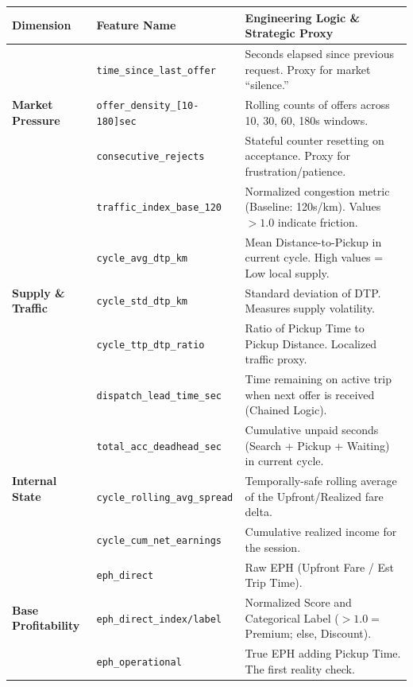 \begin{table}[H]
    \centering
    \scriptsize
    \begin{tabularx}{\textwidth}{l l X}
        \toprule
        \textbf{Dimension} & \textbf{Feature Name} & \textbf{Engineering Logic \& Strategic Proxy} \\
        \midrule
        \multirow{3}{*}{\textbf{Market Pressure}} 
        & \texttt{time\_since\_last\_offer} & Seconds elapsed since previous request. Proxy for market ``silence.'' \\
        & \texttt{offer\_density\_[10-180]sec} & Rolling counts of offers across 10, 30, 60, 180s windows. \\
        & \texttt{consecutive\_rejects} & Stateful counter resetting on acceptance. Proxy for frustration/patience. \\
        \midrule
        \multirow{5}{*}{\textbf{Supply \& Traffic}} 
        & \texttt{traffic\_index\_base\_120} & Normalized congestion metric (Baseline: 120s/km). Values $>1.0$ indicate friction. \\
        & \texttt{cycle\_avg\_dtp\_km} & Mean Distance-to-Pickup in current cycle. High values = Low local supply. \\
        & \texttt{cycle\_std\_dtp\_km} & Standard deviation of DTP. Measures supply volatility. \\
        & \texttt{cycle\_ttp\_dtp\_ratio} & Ratio of Pickup Time to Pickup Distance. Localized traffic proxy. \\
        & \texttt{dispatch\_lead\_time\_sec} & Time remaining on active trip when next offer is received (Chained Logic). \\
        \midrule
        \multirow{3}{*}{\textbf{Internal State}} 
        & \texttt{total\_acc\_deadhead\_sec} & Cumulative unpaid seconds (Search + Pickup + Waiting) in current cycle. \\
        & \texttt{cycle\_rolling\_avg\_spread} & Temporally-safe rolling average of the Upfront/Realized fare delta. \\
        & \texttt{cycle\_cum\_net\_earnings} & Cumulative realized income for the session. \\
        \midrule
        \multirow{3}{*}{\textbf{Base Profitability}} 
        & \texttt{eph\_direct} & Raw EPH (Upfront Fare / Est Trip Time). \\
        & \texttt{eph\_direct\_index/label} & Normalized Score and Categorical Label  ($>1.0=$ Premium; else, Discount). \\
        & \texttt{eph\_operational} & True EPH adding Pickup Time. The first reality check. \\

\end{tabularx}
\end{table}
